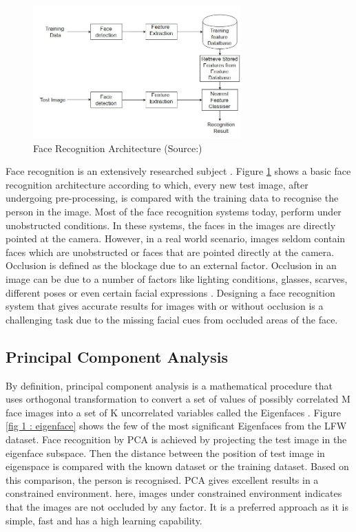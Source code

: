 \documentclass[conference]{IEEEtran}
\begin{document}
\begin{figure}[h!]

 \centering
 \includegraphics[width = 8cm]{Face_Recognition_Architecture.JPG}
 \caption{ Face Recognition Architecture (Source:\cite{makwana_makwana_2016})}
 \label{fig 1: face recognition architecture}
\end{figure}

Face recognition is an extensively researched subject\cite{zhao2003face} \cite{abate20072d}. Figure \ref{fig 1: face recognition architecture} shows a basic face recognition architecture according to which, every new test image, after undergoing pre-processing, is compared with the training data to recognise the person in the image. Most of the face recognition systems today, perform under unobstructed conditions\cite{phillips2005overview}. In these systems, the faces in the images are directly pointed at the camera. However, in a real world scenario, images seldom contain faces which are unobstructed or  faces that are pointed directly at the camera. Occlusion is defined as the blockage due to an external factor. Occlusion in an image can be due to a number of factors like lighting conditions, glasses, scarves, different poses or even certain facial expressions \cite{wright2009robust}. Designing a face recognition system that gives accurate results for images with or without occlusion is a challenging task due to the missing facial cues from occluded areas of the face.

\subsection{Principal Component Analysis}
\label{subsec: 1a.Principal Component Analysis}
By definition, principal component analysis is a mathematical procedure that uses orthogonal transformation to convert a set of values of possibly correlated M face images into a set of K uncorrelated variables called the Eigenfaces
\cite{turk1991face}. Figure \ref{fig 1 : eigenface} shows the few of the most significant Eigenfaces from the LFW dataset. Face recognition by PCA is achieved by projecting the test image in the eigenface subspace. Then the distance between the position of test image in eigenspace is compared with the known dataset or the training dataset. Based on this comparison, the person is recognised. PCA gives excellent results in a constrained environment. here, images under constrained environment indicates that the images are not occluded by any factor. It is a preferred approach as it is simple, fast and has a high learning capability.
\end{document}
